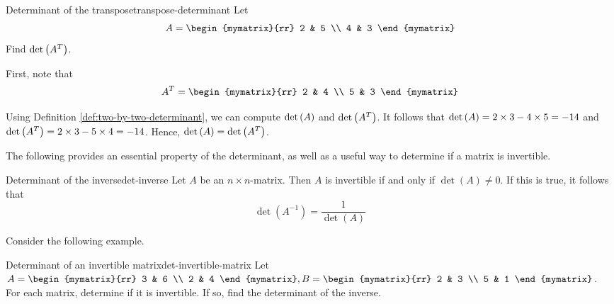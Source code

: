 \begin{example}{Determinant of the transpose}{transpose-determinant}
Let
\begin{equation*}
A
=
\begin{mymatrix}{rr}
2 & 5 \\
4 & 3
\end{mymatrix}
\end{equation*}
Find $\det \left(A^T\right)$.
\end{example}

\begin{solution}
First, note that 
\begin{equation*}
A^{T}
=
\begin{mymatrix}{rr}
2 & 4 \\
5 & 3
\end{mymatrix}
\end{equation*}

Using Definition \ref{def:two-by-two-determinant}, we can compute $\det \left(A\right)$ and $\det \left(A^T\right)$. It follows that
$\det \left(A\right) = 2 \times 3 - 4 \times 5 = -14$ and $\det \left(A^T\right) = 2 \times 3 - 5 \times 4 = -14$. 
Hence, $\det \left(A\right) = \det \left(A^T\right)$.
\end{solution}

The following provides an essential property of the determinant, as well as a useful way to determine if a matrix is invertible.

\begin{theorem}{Determinant of the inverse}{det-inverse}
Let $A$ be an $n \times n$-matrix. Then $A$ is invertible if and only if $\det(A) \neq 0$. If this is true, it follows that 
\[
\det(A^{-1}) = \frac{1}{\det(A)}
\]
\end{theorem}

Consider the following example.

\begin{example}{Determinant of an invertible matrix}{det-invertible-matrix}
Let $A = \begin{mymatrix}{rr}
3 & 6 \\
2 & 4 
\end{mymatrix}, B = \begin{mymatrix}{rr}
2 & 3 \\
5 & 1
\end{mymatrix}$. For each matrix, determine if it is invertible. If so, find the determinant of the inverse. 
\end{example}

